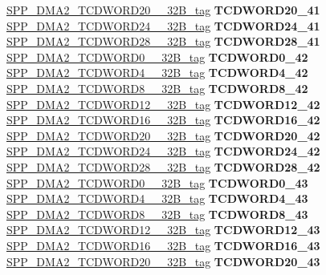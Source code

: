 \begin{DoxyCompactItemize}
\begin{tabbing}
\>\>\mbox{\hyperlink{unionSPP__DMA2__TCDWORD20____32B__tag}{SPP\_DMA2\_TCDWORD20\_\_32B\_tag}} {\bfseries TCDWORD20\_41}\\
\>\>\mbox{\hyperlink{unionSPP__DMA2__TCDWORD24____32B__tag}{SPP\_DMA2\_TCDWORD24\_\_32B\_tag}} {\bfseries TCDWORD24\_41}\\
\>\>\mbox{\hyperlink{unionSPP__DMA2__TCDWORD28____32B__tag}{SPP\_DMA2\_TCDWORD28\_\_32B\_tag}} {\bfseries TCDWORD28\_41}\\
\>\>\mbox{\hyperlink{unionSPP__DMA2__TCDWORD0____32B__tag}{SPP\_DMA2\_TCDWORD0\_\_32B\_tag}} {\bfseries TCDWORD0\_42}\\
\>\>\mbox{\hyperlink{unionSPP__DMA2__TCDWORD4____32B__tag}{SPP\_DMA2\_TCDWORD4\_\_32B\_tag}} {\bfseries TCDWORD4\_42}\\
\>\>\mbox{\hyperlink{unionSPP__DMA2__TCDWORD8____32B__tag}{SPP\_DMA2\_TCDWORD8\_\_32B\_tag}} {\bfseries TCDWORD8\_42}\\
\>\>\mbox{\hyperlink{unionSPP__DMA2__TCDWORD12____32B__tag}{SPP\_DMA2\_TCDWORD12\_\_32B\_tag}} {\bfseries TCDWORD12\_42}\\
\>\>\mbox{\hyperlink{unionSPP__DMA2__TCDWORD16____32B__tag}{SPP\_DMA2\_TCDWORD16\_\_32B\_tag}} {\bfseries TCDWORD16\_42}\\
\>\>\mbox{\hyperlink{unionSPP__DMA2__TCDWORD20____32B__tag}{SPP\_DMA2\_TCDWORD20\_\_32B\_tag}} {\bfseries TCDWORD20\_42}\\
\>\>\mbox{\hyperlink{unionSPP__DMA2__TCDWORD24____32B__tag}{SPP\_DMA2\_TCDWORD24\_\_32B\_tag}} {\bfseries TCDWORD24\_42}\\
\>\>\mbox{\hyperlink{unionSPP__DMA2__TCDWORD28____32B__tag}{SPP\_DMA2\_TCDWORD28\_\_32B\_tag}} {\bfseries TCDWORD28\_42}\\
\>\>\mbox{\hyperlink{unionSPP__DMA2__TCDWORD0____32B__tag}{SPP\_DMA2\_TCDWORD0\_\_32B\_tag}} {\bfseries TCDWORD0\_43}\\
\>\>\mbox{\hyperlink{unionSPP__DMA2__TCDWORD4____32B__tag}{SPP\_DMA2\_TCDWORD4\_\_32B\_tag}} {\bfseries TCDWORD4\_43}\\
\>\>\mbox{\hyperlink{unionSPP__DMA2__TCDWORD8____32B__tag}{SPP\_DMA2\_TCDWORD8\_\_32B\_tag}} {\bfseries TCDWORD8\_43}\\
\>\>\mbox{\hyperlink{unionSPP__DMA2__TCDWORD12____32B__tag}{SPP\_DMA2\_TCDWORD12\_\_32B\_tag}} {\bfseries TCDWORD12\_43}\\
\>\>\mbox{\hyperlink{unionSPP__DMA2__TCDWORD16____32B__tag}{SPP\_DMA2\_TCDWORD16\_\_32B\_tag}} {\bfseries TCDWORD16\_43}\\
\>\>\mbox{\hyperlink{unionSPP__DMA2__TCDWORD20____32B__tag}{SPP\_DMA2\_TCDWORD20\_\_32B\_tag}} {\bfseries TCDWORD20\_43}\\

\end{tabbing}
\end{DoxyCompactItemize}
